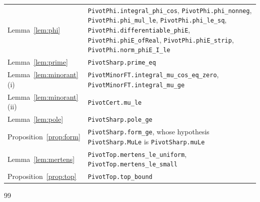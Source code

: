 \documentclass[11pt]{article}
\theoremstyle{definition}
\newcommand{\lean}[1]{\texttt{#1}}
\begin{document}
{\begin{longtable}{@{}p{}>{\raggedright\arraybackslash}p{}@{}}
Lemma~\ref{lem:phi} & \lean{PivotPhi.integral\_phi\_cos}, \lean{PivotPhi.phi\_nonneg}, \lean{PivotPhi.phi\_mul\_le},
\lean{PivotPhi.phi\_le\_sq}, \lean{PivotPhi.differentiable\_phiE}, \lean{PivotPhi.phiE\_ofReal},
\lean{PivotPhi.phiE\_strip}, \lean{PivotPhi.norm\_phiE\_I\_le} \\
Lemma~\ref{lem:prime} & \lean{PivotSharp.prime\_eq} \\
Lemma~\ref{lem:minorant}(i) & \lean{PivotMinorFT.integral\_mu\_cos\_eq\_zero}, \lean{PivotMinorFT.integral\_mu\_ge} \\
Lemma~\ref{lem:minorant}(ii) & \lean{PivotCert.mu\_le} \\
Lemma~\ref{lem:pole} & \lean{PivotSharp.pole\_ge} \\
Proposition~\ref{prop:form} & \lean{PivotSharp.form\_ge}, whose hypothesis \lean{PivotSharp.MuLe} is
\lean{PivotSharp.muLe} \\
Lemma~\ref{lem:mertens} & \lean{PivotTop.mertens\_le\_uniform}, \lean{PivotTop.mertens\_le\_small} \\
Proposition~\ref{prop:top} & \lean{PivotTop.top\_bound} \\
\bottomrule
\end{longtable}
}

\begin{thebibliography}{99}
\raggedright

\end{thebibliography}
\end{document}
